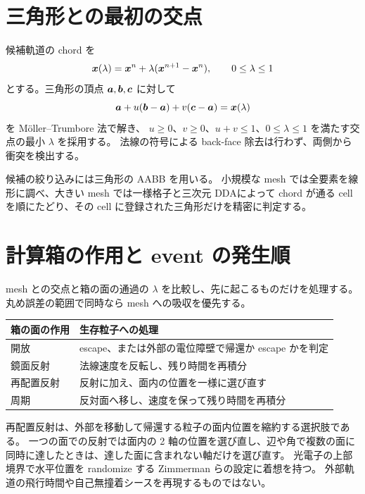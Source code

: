 \section{三角形との最初の交点}
候補軌道の chord を
\begin{equation}
 \bm{x}(\lambda)=\bm{x}^n+\lambda(\bm{x}^{n+1}-\bm{x}^n),
 \qquad 0\le\lambda\le1
\end{equation}
とする。三角形の頂点 $\bm{a},\bm{b},\bm{c}$ に対して
\begin{equation}
 \bm{a}+u(\bm{b}-\bm{a})+v(\bm{c}-\bm{a})=\bm{x}(\lambda)
\end{equation}
を Möller--Trumbore 法で解き\citep{MollerTrumbore1997}、
$u\ge0$、$v\ge0$、$u+v\le1$、$0\le\lambda\le1$ を満たす交点の最小 $\lambda$ を採用する。
法線の符号による back-face 除去は行わず、両側から衝突を検出する。

候補の絞り込みには三角形の AABB を用いる。
小規模な mesh では全要素を線形に調べ、大きい mesh では一様格子と三次元 DDA\citep{AmanatidesWoo1987}によって
chord が通る cell を順にたどり、その cell に登録された三角形だけを精密に判定する。

\section{計算箱の作用と event の発生順}
mesh との交点と箱の面の通過の $\lambda$ を比較し、先に起こるものだけを処理する。
丸め誤差の範囲で同時なら mesh への吸収を優先する。
\begin{center}
\begin{tabularx}{\textwidth}{lY}
\toprule
箱の面の作用 & 生存粒子への処理 \\
\midrule
開放 & escape、または外部の電位障壁で帰還か escape かを判定 \\
鏡面反射 & 法線速度を反転し、残り時間を再積分 \\
再配置反射 & 反射に加え、面内の位置を一様に選び直す \\
周期 & 反対面へ移し、速度を保って残り時間を再積分 \\
\bottomrule
\end{tabularx}
\end{center}
再配置反射は、外部を移動して帰還する粒子の面内位置を縮約する選択肢である。
一つの面での反射では面内の 2 軸の位置を選び直し、辺や角で複数の面に同時に達したときは、達した面に含まれない軸だけを選び直す。
光電子の上部境界で水平位置を randomize する Zimmerman らの設定に着想を持つ\citep{Zimmerman2016}。
外部軌道の飛行時間や自己無撞着シースを再現するものではない。

